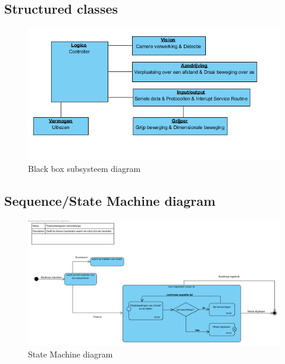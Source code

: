 \documentclass[12pt]{article} %
\begin{document}
\subsection{Structured classes}
\begin{center}
\begin{figure}[h]
\includegraphics[scale=1.]{BlackBoxDiagram.png}
\caption{Black box subsysteem diagram}
\label{fig:deployment}
\end{figure}
\end{center}
\clearpage

\begin{landscape}
\subsection{Sequence/State Machine diagram}
\begin{center}
\begin{figure}[h]
\includegraphics[scale=.6]{StateMachineDiagram.png}
\caption{State Machine diagram}
\label{fig:deployment}
\end{figure}
\end{center}
\clearpage
\newpage
\end{landscape}
\end{document}
